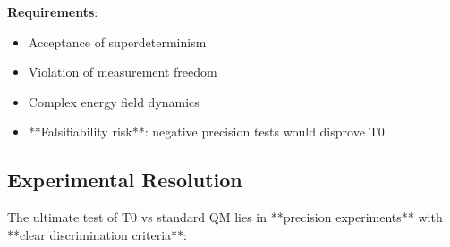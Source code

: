 \documentclass[12pt,a4paper]{article}
\begin{document}
	\textbf{Requirements}:
	\begin{itemize}
		\item Acceptance of superdeterminism
		\item Violation of measurement freedom
		\item Complex energy field dynamics
		\item **Falsifiability risk**: negative precision tests would disprove T0
	\end{itemize}
	
	\subsection{Experimental Resolution}
	
	The ultimate test of T0 vs standard QM lies in **precision experiments** with **clear discrimination criteria**:
	
\end{document}
